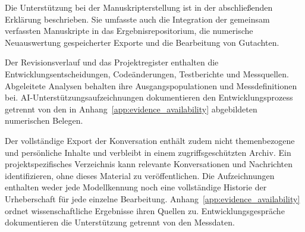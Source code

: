 Die Unterstützung bei der Manuskripterstellung ist in der abschließenden Erklärung \emph{} beschrieben. Sie umfasste auch die Integration der gemeinsam verfassten Manuskripte in das Ergebnisrepositorium, die numerische Neuauswertung gespeicherter Exporte und die Bearbeitung von Gutachten.

Der Revisionsverlauf und das Projektregister enthalten die Entwicklungsentscheidungen, Codeänderungen, Testberichte und Messquellen. Abgeleitete Analysen behalten ihre Ausgangspopulationen und Messdefinitionen bei. AI-Unterstützungsaufzeichnungen dokumentieren den Entwicklungsprozess getrennt von den in Anhang~\ref{app:evidence_availability} abgebildeten numerischen Belegen.

Der vollständige Export der Konversation enthält zudem nicht themenbezogene und persönliche Inhalte und verbleibt in einem zugriffsgeschützten Archiv. Ein projektspezifisches Verzeichnis kann relevante Konversationen und Nachrichten identifizieren, ohne dieses Material zu veröffentlichen. Die Aufzeichnungen enthalten weder jede Modellkennung noch eine vollständige Historie der Urheberschaft für jede einzelne Bearbeitung. Anhang~\ref{app:evidence_availability} ordnet wissenschaftliche Ergebnisse ihren Quellen zu. Entwicklungsgespräche dokumentieren die Unterstützung getrennt von den Messdaten.
